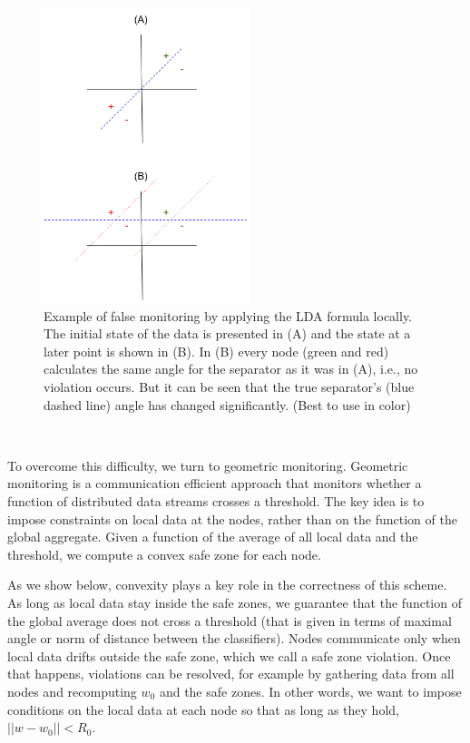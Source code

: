 \documentclass[11pt,twocolumn,varwidth=true,a4paper,fleqn]{article}
\begin{document}
\begin{figure}[h]
\centering
\includegraphics[width=60mm]{NegativeExample.png}
\caption{Example of false monitoring by applying the LDA formula locally. The
initial state of the data is presented in (A) and the state at a later point
is shown in (B). In (B) every node (green and red) calculates the same angle
for the separator as it was in (A), i.e., no violation occurs. But it can be
seen that the true separator's (blue dashed line) angle has changed
significantly. (Best to use in color)}
\label{NegativeExampl}
\end{figure}


\\\par To overcome this difficulty, we turn to geometric monitoring. Geometric
monitoring \cite{keren2014geometric, keren2012shape} is a communication
efficient approach that monitors whether a function of distributed
data streams crosses a threshold. The key idea is to
impose constraints on local data at the nodes, rather than
on the function of the global aggregate. Given a function of
the average of all local data and the threshold, we compute a
convex safe zone for each node. 
\\\par As we show below, convexity
plays a key role in the correctness of this scheme. As long
as local data stay inside the safe zones, we guarantee that
the function of the global average does not cross a threshold (that is given
in terms of maximal angle or norm of distance between the classifiers).
Nodes communicate only when local data drifts outside the
safe zone, which we call a safe zone violation. Once that
happens, violations can be resolved, for example by gathering
data from all nodes and recomputing $w_0$ and the safe zones.
In other words, we want to impose conditions on the local
data at each node so that as long as they hold, $||w-w_0||<R_0$.
\end{document}
